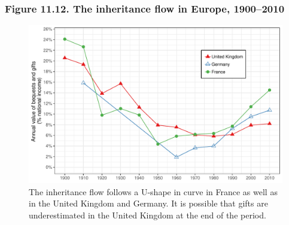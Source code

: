 \documentclass[t]{beamer}\usepackage[]{graphicx}\usepackage[]{color}
\newenvironment{knitrout}{}{} %
\begin{document}
\begin{frame}[label=Figure_11_12]
\frametitle{Figure 11.12. The inheritance flow in Europe, 1900--2010}
\begin{figure}[t]
\begin{minipage}[b]{\textwidth}
\centering
\begin{knitrout}\footnotesize
{}\color{fgcolor}

{\centering \includegraphics[width=1\linewidth]{figures/color/Figure_11_12} 

}



\end{knitrout}
\caption{The inheritance flow follows a U-shape in curve in France as well as in the United Kingdom and Germany. It is possible that gifts are underestimated in the United Kingdom at the end of the period.}
\end{minipage}
\end{figure}
\end{frame}
\end{document}
